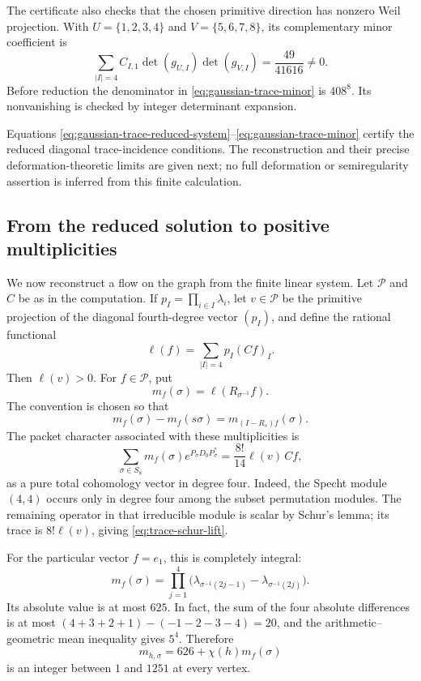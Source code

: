 \documentclass[11pt]{article}
\theoremstyle{definition}
\theoremstyle{remark}
\begin{document}
The certificate also checks that the chosen primitive direction has
nonzero Weil projection.  With \(U=\{1,2,3,4\}\) and
\(V=\{5,6,7,8\}\), its complementary minor coefficient is
\begin{equation}
 \sum_{|I|=4}C_{I,1}\det(g_{U,I})\det(g_{V,I})
 =
 \frac{49}{41616}\ne0.
 \label{eq:gaussian-trace-minor}
\end{equation}
Before reduction the denominator in \eqref{eq:gaussian-trace-minor} is \(408^8\).  Its
nonvanishing is checked by integer determinant expansion.

Equations \eqref{eq:gaussian-trace-reduced-system}--\eqref{eq:gaussian-trace-minor} certify the reduced diagonal trace-incidence
conditions.  The reconstruction and their precise deformation-theoretic
limits are given next; no full deformation or semiregularity assertion
is inferred from this finite calculation.


\subsection{From the reduced solution to positive multiplicities}

We now reconstruct a flow on the graph from the finite linear system.
Let \(\mathcal P\) and \(C\) be as in the computation.  If
\(p_I=\prod_{i\in I}\lambda_i\), let \(v\in\mathcal P\)
be the primitive projection of the diagonal fourth-degree vector
\((p_I)\), and define the rational functional
\[
 \ell(f)=\sum_{|I|=4}p_I(Cf)_I.
\]
Then \(\ell(v)>0\).  For \(f\in\mathcal P\), put
\begin{equation}
 m_f(\sigma)=\ell(R_{\sigma^{-1}}f).
 \label{eq:trace-matrix-coefficient}
\end{equation}
The convention is chosen so that
\[
 m_f(\sigma)-m_f(s\sigma)=m_{(I-R_s)f}(\sigma).
\]
The packet character associated with these multiplicities is
\begin{equation}
 \sum_{\sigma\in S_8}m_f(\sigma)e^{P_\sigma D_0P_\sigma^*}
 =\frac{8!}{14}\ell(v)\,Cf,
 \label{eq:trace-schur-lift}
\end{equation}
as a pure total cohomology vector in degree four.
Indeed, the Specht module \((4,4)\) occurs only in degree four
among the subset permutation modules.  The remaining operator in
that irreducible module is scalar by Schur's lemma; its trace is
\(8!\ell(v)\), giving \eqref{eq:trace-schur-lift}.

For the particular vector \(f=e_1\), this is completely integral:
\begin{equation}
 m_f(\sigma)=\prod_{j=1}^4
  \bigl(\lambda_{\sigma^{-1}(2j-1)}
       -\lambda_{\sigma^{-1}(2j)}\bigr).
 \label{eq:trace-explicit-multiplicity}
\end{equation}
Its absolute value is at most \(625\).  In fact, the sum of the
four absolute differences is at most
\((4+3+2+1)-(-1-2-3-4)=20\), and the arithmetic--geometric
mean inequality gives \(5^4\).  Therefore
\begin{equation}
 m_{h,\sigma}=626+\chi(h)m_f(\sigma)
 \label{eq:trace-positive-multiplicity}
\end{equation}
is an integer between \(1\) and \(1251\) at every vertex.
\end{document}
